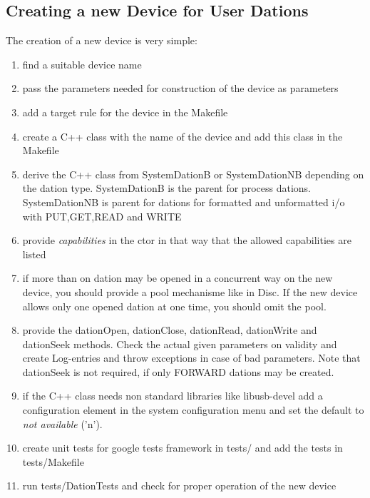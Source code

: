 \subsection{Creating a new Device for User Dations}
The creation of a new device is very simple:
\begin{enumerate}
\item find a suitable device name
\item pass the parameters needed for construction of the device as
      parameters
\item add a target rule for the device in the Makefile
\item create a C++ class with the name of the device and add this class
      in the Makefile
\item derive the C++ class from SystemDationB or SystemDationNB depending
      on the dation type. SystemDationB is the parent for process dations.
      SystemDationNB is parent for dations for formatted and unformatted
      i/o with PUT,GET,READ and WRITE
\item provide {\em capabilities} in the ctor in that way that the allowed
      capabilities are listed
\item if more than on dation may be opened in a concurrent way on the new
      device, you should provide a pool mechanisme like in Disc.
      If the new device allows only one opened dation at one time, you 
      should omit the pool.
\item provide the dationOpen, dationClose, dationRead, dationWrite 
      and dationSeek methods. Check the actual given parameters on
      validity and create Log-entries and throw exceptions in case
      of bad parameters.
      Note that dationSeek is not required, if only FORWARD dations
      may be created.
\item if the C++ class needs non standard libraries like libusb-devel
      add a configuration element in the system configuration menu
      and set the default to {\em not available} ('n').
\item create unit tests for google tests framework in tests/ and add the
      tests in tests/Makefile
\item run tests/DationTests and check for proper operation of the new device
\end{enumerate}

